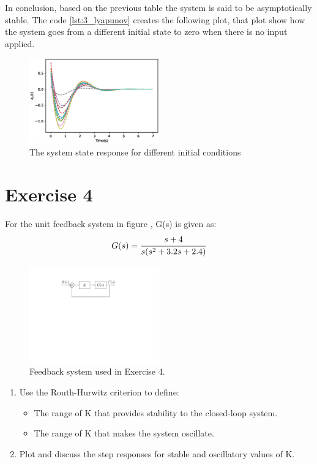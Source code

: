 \documentclass[a4paper]{article}
\begin{document}
In conclusion, based on the previous table the system is said to be asymptotically stable. The code \ref{lst:3_lyapunov} creates the following plot, that plot show how the system goes from a different initial state to zero when there is no input applied.
\begin{figure}[H]
\centering
\includegraphics[width=0.5\textwidth]{Figures/Question3/EXE_3_SYS_LYAPUNOV.eps}
\caption{The system state response for different initial conditions}
\end{figure}
\section*{Exercise 4} 
For the unit feedback system in figure , G(s) is given as:
\begin{align*}
    G(s) =\cfrac{s+4}{s(s^2+3.2s+2.4)} 
\end{align*}
\begin{figure}[H] \begin{center}
\includegraphics [width=0.5\textwidth] {Figures/FromMichela/Question4_Figure_1.pdf} \vskip-0.4cm
\caption{Feedback system used in Exercise 4.}
\label{fig:ex4}
\end{center}
\end{figure}
\begin{enumerate}
    \item Use the Routh-Hurwitz criterion to define:
    \begin{itemize}
        \item The range of K that provides stability to the closed-loop system.
        \item The range of K that makes the system oscillate.
    \end{itemize}
    \item Plot and discuss the step responses for stable and oscillatory values of K.
\end{enumerate}
\end{document}
